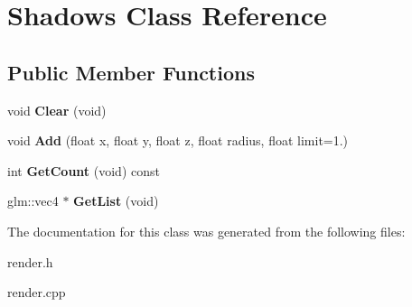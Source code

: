\hypertarget{classShadows}{\section{\-Shadows \-Class \-Reference}
\label{classShadows}
}
\subsection*{\-Public \-Member \-Functions}
\begin{DoxyCompactItemize}
\item 
\hypertarget{classShadows_ab23c4ce71f75da12fcbede661e58e5b1}{void {\bfseries \-Clear} (void)}\label{classShadows_ab23c4ce71f75da12fcbede661e58e5b1}

\item 
\hypertarget{classShadows_a4eae23034eb1131810890ec8b764ea66}{void {\bfseries \-Add} (float x, float y, float z, float radius, float limit=1.)}\label{classShadows_a4eae23034eb1131810890ec8b764ea66}

\item 
\hypertarget{classShadows_aff6237dabe954f9985b7b7a246e53c70}{int {\bfseries \-Get\-Count} (void) const }\label{classShadows_aff6237dabe954f9985b7b7a246e53c70}

\item 
\hypertarget{classShadows_aba6e89e2dde67a6b27f727c83846537a}{glm\-::vec4 $\ast$ {\bfseries \-Get\-List} (void)}\label{classShadows_aba6e89e2dde67a6b27f727c83846537a}

\end{DoxyCompactItemize}


\-The documentation for this class was generated from the following files\-:\begin{DoxyCompactItemize}
\item 
render.\-h\item 
render.\-cpp\end{DoxyCompactItemize}
